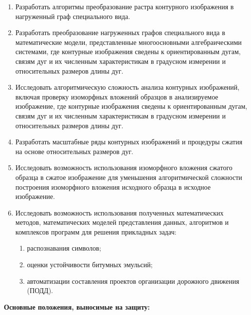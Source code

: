 \begin{enumerate}
\item Разработать алгоритмы преобразование растра контурного изображения в нагруженный граф специального вида.
\item Разработать преобразование нагруженных графов специального вида в математические модели, представленные многоосновными алгебраическими системами, где контурные изображения сведены к ориентированным дугам, связям дуг и их численным характеристикам в градусном измерении и  относительных размеров  длины дуг.
\item Исследовать алгоритмическую сложность  анализа контурных изображений, включая проверку изоморфных вложений образцов в анализируемое изображение, где контурные изображения сведены к ориентированным дугам, связям дуг и их численным характеристикам в градусном измерении и  относительных размеров  длины дуг.
\item Разработать  масштабные ряды контурных изображений и процедуры сжатия на  основе относительных размеров дуг.
\item Исследовать возможность использования  изоморфного вложения сжатого образца в сжатое изображение для уменьшения алгоритмической сложности построения  изоморфного вложения исходного образца в исходное изображение.
\item Исследовать возможность использования полученных математических методов, математических моделей представления данных, алгоритмов и комплексов программ для решения прикладных задач:
 \begin{enumerate}
 \item распознавания символов; 
 \item оценки устойчивости битумных эмульсий;
 \item автоматизации составления проектов организации дорожного движения (ПОДД).
 \end{enumerate}
\end{enumerate}
 
\textbf{Основные положения, выносимые на защиту:}

